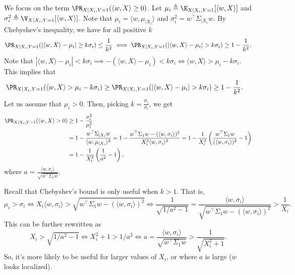 We focus on the term $\PR_{X \mid X_i, Y=1}( \langle w, X \rangle \geq 0 )$.
Let $\mu_i \triangleq \E_{X \mid X_i, Y=1}[ \langle w, X \rangle ]$ and $\sigma_i^2 \triangleq \V_{X \mid X_i, Y=1}[ \langle w, X \rangle ]$.
Note that $\mu_i = \langle w, \mu_{\mid X_i} \rangle$ and $\sigma_i^2 = w^\top \Sigma_{\mid X_i} w$.
By Chebyshev's inequality, we have for all positive $k$
\begin{align*}
    \PR_{X \mid X_i, Y=1}( | \langle w, X \rangle - \mu_i | \geq k \sigma_i ) \leq \frac{1}{k^2}
    \iff
    \PR_{X \mid X_i, Y=1}( | \langle w, X \rangle - \mu_i | > k \sigma_i ) \geq 1 - \frac{1}{k^2}.
\end{align*}
Note that $| \langle w, X \rangle - \mu_i | < k \sigma_i \implies -(\langle w, X \rangle - \mu_i) < k \sigma_i \iff \langle w, X \rangle > \mu_i - k \sigma_i$.
This implies that
\begin{align*}
    \PR_{X \mid X_i, Y=1}( \langle w, X \rangle > \mu_i - k \sigma_i )
    &\geq \PR_{X \mid X_i, Y=1}( | \langle w, X \rangle - \mu_i | > k \sigma_i )
    \geq 1 - \frac{1}{k^2}.
\end{align*}
Let us assume that $\mu_i > 0$.
Then, picking $k = \frac{\mu_i}{\sigma_i}$, we get
\begin{align*}
    \PR_{X \mid X_i, Y=1}( \langle w, X \rangle > 0 )
    &\geq 1 - \frac{\sigma_i^2}{\mu_i^2} \\
    &= 1 - \frac{w^\top \Sigma_{\mid X_i} w}{\langle w, \mu_{\mid X_i} \rangle^2}
    = 1 - \frac{w^\top \Sigma_1 w - (\langle w, \sigma_i \rangle)^2}{X_i^2 \langle w, \sigma_i \rangle^2}
    = 1 - \frac{1}{X_i^2} \left( \frac{w^\top \Sigma_1 w}{(\langle w, \sigma_i \rangle)^2} - 1 \right) \\
    &= 1 - \frac{1}{X_i^2} \left( \frac{1}{a^2} - 1 \right),
\end{align*}
where $a = \frac{\langle w, \sigma_i \rangle}{\sqrt{w^\top \Sigma_1 w}}$.

Recall that Chebyshev's bound is only useful when $k > 1$.
That is, $$ \mu_i > \sigma_i \iff X_i \langle w, \sigma_i \rangle > \sqrt{w^\top \Sigma_1 w - (\langle w, \sigma_i \rangle)^2} \iff \frac{1}{\sqrt{1/a^2 - 1}} = \frac{ \langle w, \sigma_i \rangle }{ \sqrt{w^\top \Sigma_1 w - (\langle w, \sigma_i \rangle)^2} } > \frac{1}{X_i}. $$
This can be further rewritten as $$ X_i > \sqrt{1/a^2 - 1} \iff X_i^2 + 1 > 1/a^2 \iff a = \frac{\langle w, \sigma_i \rangle}{\sqrt{w^\top \Sigma_1 w}} > \frac{1}{\sqrt{X_i^2 + 1}}. $$
So, it's more likely to be useful for larger values of $X_i$, or where $a$ is large ($w$ looks localized).

